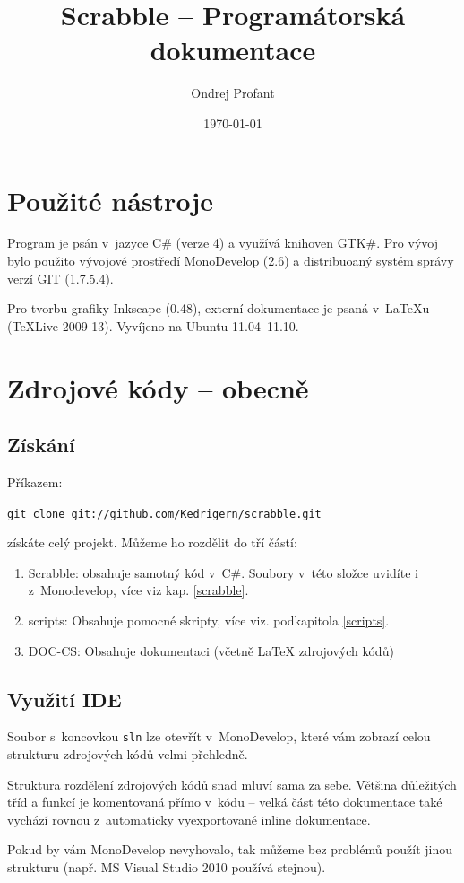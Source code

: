 \documentclass[a4paper]{article}
\title{Scrabble -- Programátorská dokumentace}
\author{Ondrej Profant}
\date{\today}
\begin{document}
\tableofcontents	

\newpage

\section{Použité nástroje}
Program je psán v~jazyce C\# (verze 4) a využívá knihoven GTK\#. 
Pro vývoj bylo použito vývojové prostředí MonoDevelop (2.6) a distribuoaný systém správy verzí GIT (1.7.5.4).

Pro tvorbu grafiky Inkscape (0.48), externí dokumentace je psaná v~\LaTeX{u} (TeXLive 2009-13). Vyvíjeno na Ubuntu 11.04--11.10.



\section{Zdrojové kódy -- obecně}
\subsection{Získání}
Příkazem:

\texttt{git clone git://github.com/Kedrigern/scrabble.git} 

\noindent
získáte celý projekt. Můžeme ho rozdělit do tří částí:
\begin{enumerate}
\item Scrabble: obsahuje samotný kód v~C\#. Soubory v~této složce uvidíte i z~Monodevelop, více viz kap. \ref{scrabble}.
\item scripts: Obsahuje pomocné skripty, více viz. podkapitola \ref{scripts}.
\item DOC-CS: Obsahuje dokumentaci (včetně \LaTeX{} zdrojových kódů)
\end{enumerate}

\subsection{Využití IDE}
Soubor s~koncovkou \texttt{sln} lze otevřít v~MonoDevelop, které vám zobrazí celou strukturu zdrojových kódů velmi přehledně.

Struktura rozdělení zdrojových kódů snad mluví sama za sebe. Většina důležitých tříd a funkcí je komentovaná přímo v~kódu -- velká část této dokumentace také vychází rovnou z~automaticky vyexportované inline dokumentace. 

Pokud by vám MonoDevelop nevyhovalo, tak můžeme bez problémů použít jinou strukturu (např. MS Visual Studio 2010 používá stejnou).
\end{document}
